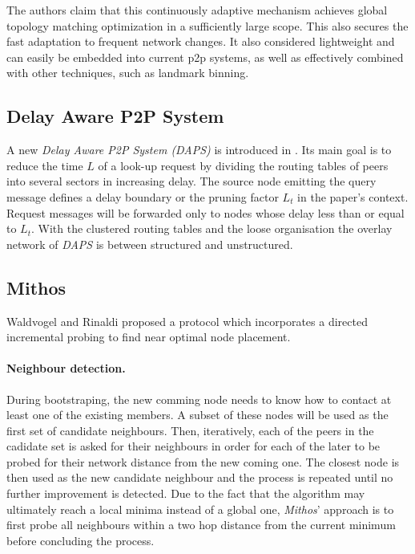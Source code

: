 \documentclass[a4paper,10pt]{article}
\begin{document}
The authors claim that this continuously adaptive mechanism achieves global topology matching optimization in a sufficiently large scope. This also secures the fast adaptation to frequent network changes. It also considered lightweight and can easily be embedded into current p2p systems, as well as effectively combined with other techniques, such as landmark binning.

\subsection{Delay Aware P2P System}
A new \emph{Delay Aware P2P System (DAPS)} is introduced in \cite{zhang_daps_2005}. Its main goal is to reduce the time $L$ of a look-up request by dividing the routing tables of peers into several sectors in increasing delay. The source node emitting the query message defines a delay boundary or the pruning factor $L_t$ in the paper's context. Request messages will be forwarded only to nodes whose delay less than or equal to $L_t$. With the clustered routing tables and the loose organisation the overlay network of \emph{DAPS} is between structured and unstructured.

\subsection{Mithos}
Waldvogel and Rinaldi proposed a protocol\cite{waldvogel_mythos_2003} which incorporates a directed incremental probing to find near optimal node placement.
\paragraph{Neighbour detection.} During bootstraping, the new comming node needs to know how to contact at least one of the existing members. A subset of these nodes will be used as the first set of candidate neighbours. Then, iteratively, each of the peers in the cadidate set is asked for their neighbours in order for each of the later to be probed for their network distance from the new coming one. The closest node is then used as the new candidate neighbour and the process is repeated until no further improvement is detected. Due to the fact that the algorithm may ultimately reach a local minima instead of a global one, \emph{Mithos}' approach is to first probe all neighbours within a two hop distance from the current minimum before concluding the process.
\end{document}
